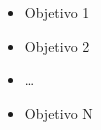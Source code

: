 \begin{itemize}

    \item[•] Objetivo 1

    \item[•] Objetivo 2

    \item[•] \ldots

    \item[•] Objetivo N

\end{itemize}